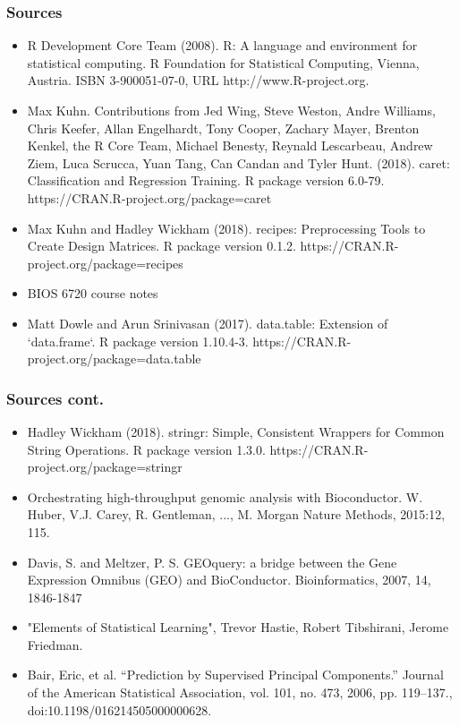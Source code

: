 \documentclass[11pt]{beamer}
\begin{document}
\begin{frame}
\frametitle{Sources}
\begin{itemize}\scriptsize
\item R Development Core Team (2008). R: A language and environment for
  statistical computing. R Foundation for Statistical Computing,
  Vienna, Austria. ISBN 3-900051-07-0, URL http://www.R-project.org.
\item Max Kuhn. Contributions from Jed Wing, Steve Weston, Andre Williams,
  Chris Keefer, Allan Engelhardt, Tony Cooper, Zachary Mayer, Brenton
  Kenkel, the R Core Team, Michael Benesty, Reynald Lescarbeau, Andrew
  Ziem, Luca Scrucca, Yuan Tang, Can Candan and Tyler Hunt. (2018).
  caret: Classification and Regression Training. R package version
  6.0-79. https://CRAN.R-project.org/package=caret
 \item Max Kuhn and Hadley Wickham (2018). recipes: Preprocessing Tools to
  Create Design Matrices. R package version 0.1.2.
  https://CRAN.R-project.org/package=recipes

\item BIOS 6720 course notes
\item   Matt Dowle and Arun Srinivasan (2017). data.table: Extension of
  `data.frame`. R package version 1.10.4-3.
  https://CRAN.R-project.org/package=data.table
\end{itemize}
\end{frame}

\begin{frame}
\frametitle{Sources cont.}
\begin{itemize}\scriptsize
\item   Hadley Wickham (2018). stringr: Simple, Consistent Wrappers for
  Common String Operations. R package version 1.3.0.
  https://CRAN.R-project.org/package=stringr
\item   Orchestrating high-throughput genomic analysis with Bioconductor. W.
  Huber, V.J. Carey, R. Gentleman, ..., M. Morgan Nature Methods,
  2015:12, 115.
\item   Davis, S. and Meltzer, P. S. GEOquery: a bridge between the Gene
  Expression Omnibus (GEO) and BioConductor. Bioinformatics, 2007, 14,
  1846-1847
\item "Elements of Statistical Learning", Trevor Hastie, Robert Tibshirani, Jerome Friedman.
\item Bair, Eric, et al. “Prediction by Supervised Principal Components.” Journal of the American Statistical Association, vol. 101, no. 473, 2006, pp. 119–137., doi:10.1198/016214505000000628. 
\end{itemize}
\end{frame}
\end{document}
